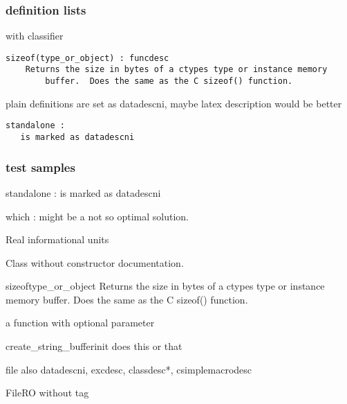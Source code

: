 \subsubsection{definition lists\label{-definition-lists}}

with classifier
\begin{verbatim}
sizeof(type_or_object) : funcdesc
    Returns the size in bytes of a ctypes type or instance memory
        buffer.  Does the same as the C sizeof() function.
\end{verbatim}

plain definitions are set as datadescni, maybe latex description would
be better
\begin{verbatim}
standalone :
   is marked as datadescni
\end{verbatim}


\subsubsection{test samples\label{-test-samples}}

\begin{datadescni}{standalone :}
is marked as datadescni
\end{datadescni}

\begin{datadescni}{which :}
might be a not so optimal solution.
\end{datadescni}

Real informational units

\begin{classdesc*}{Class}
without constructor documentation.
\end{classdesc*}

\begin{funcdesc}{sizeof}{type_or_object}
Returns the size in bytes of a ctypes type or instance memory
buffer.  Does the same as the C sizeof() function.
\end{funcdesc}

a function with optional parameter

\begin{funcdesc}{create_string_buffer}{init}
does this or that
\end{funcdesc}

\begin{datadesc}{file}
also datadescni, excdesc, classdesc*, csimplemacrodesc
\end{datadesc}

\begin{ctypedesc}{FileRO}
without tag
\end{ctypedesc}

